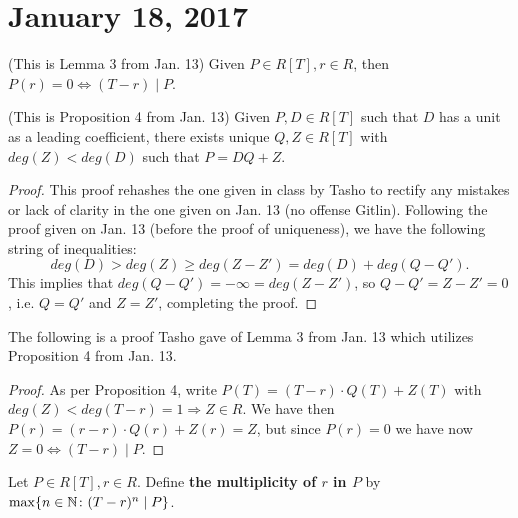 \section{January 18, 2017}
\begin{lemma}
(This is Lemma 3 from Jan. 13) Given $P \in R[T], r \in R$, then $P(r) = 0 \Leftrightarrow (T - r) \mid P$.
\end{lemma}

\begin{prop}
(This is Proposition 4 from Jan. 13) Given $P, D \in R[T]$ such that $D$ has a unit as a leading coefficient, there exists unique $Q, Z \in R[T]$ with $deg(Z) < deg(D)$ such that $P = DQ + Z$.
\end{prop}

\begin{proof}
This proof rehashes the one given in class by Tasho to rectify any mistakes or lack of clarity in the one given on Jan. 13 (no offense Gitlin). Following the proof given on Jan. 13 (before the proof of uniqueness), we have the following string of inequalities:
\[deg(D) > deg(Z) \geq deg(Z - Z') = deg(D) + deg(Q - Q').\]
This implies that $deg(Q - Q') = -\infty = deg(Z - Z')$, so $Q - Q' = Z - Z' = 0$, i.e. $Q = Q'$ and $Z = Z'$, completing the proof.
\end{proof}

The following is a proof Tasho gave of Lemma 3 from Jan. 13 which utilizes Proposition 4 from Jan. 13.
\begin{proof}
As per Proposition 4, write $P(T) = (T - r) \cdot Q(T) + Z(T)$ with $deg(Z) < deg(T - r) = 1 \Rightarrow Z \in R$. We have then $P(r) = (r - r) \cdot Q(r) + Z(r) = Z$, but since $P(r) = 0$ we have now $Z = 0 \Leftrightarrow (T - r) \mid P$.
\end{proof}

\begin{defn}
Let $P \in R[T], r \in R$. Define \textbf{the multiplicity of $r$ in $P$} by $\max\{n \in \mathbb{N} \colon (T - r)^n \mid P\}$.
\end{defn}

